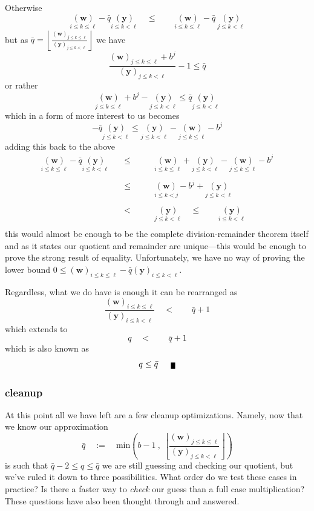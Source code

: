 \documentclass[twoside]{article}
\renewcommand{\leq}{\ensuremath{\quad\le\qquad}}
\newcommand{\bradix}[2][u]{\ensuremath{\underset{#2}{(\bm{#1})}}}
\newcommand{\numer}[3][w]{\ensuremath{(\bm{#1})_{#2\le k\le #3}}}
\newcommand{\denom}[3][y]{\ensuremath{(\bm{#1})_{#2\le k <  #3}}}
\newcommand{\qed}{\nobreak \ifvmode \relax \else
      \ifdim\lastskip<1.5em \hskip-\lastskip
      \hskip1.5em plus0em minus0.5em \fi \nobreak
      \vrule height0.5em width0.5em depth0.25em\fi}
\begin{document}
Otherwise
$$ \bradix[w]{i\le k\le\ell}-\bar{q}\bradix[y]{i\le k < \ell}
	\leq\bradix[w]{i\le k\le\ell}-\bar{q}\ \bradix[y]{j\le k < \ell} $$
but as $ \bar{q}=\left\lfloor\frac{\numer{j}{\ell}}{\denom{j}{\ell}}\right\rfloor $ we have
$$ \frac{\numer{j}{\ell}+b^j}{\denom{j}{\ell}}-1\le\bar{q} $$
or rather
$$ \bradix[w]{j\le k\le\ell}+b^j-\bradix[y]{j\le k < \ell}\le\bar{q}\bradix[y]{j\le k < \ell} $$
which in a form of more interest to us becomes
$$ -\bar{q}\bradix[y]{j\le k < \ell}\le\bradix[y]{j\le k < \ell}-\bradix[w]{j\le k\le\ell}-b^j $$
adding this back to the above
$$ \begin{array}{rcl}
\bradix[w]{i\le k\le\ell}-\bar{q}\bradix[y]{i\le k < \ell}
	& \leq & \bradix[w]{i\le k\le\ell}+\bradix[y]{j\le k < \ell}-\bradix[w]{j\le k\le\ell}-b^j \\
\\
	& \leq & \bradix[w]{i\le k < j}-b^j+\bradix[y]{j\le k < \ell} \\
\\
	& \quad <\qquad & \bradix[y]{j\le k < \ell}\leq\bradix[y]{i\le k < \ell} \\
\end{array} $$
this would almost be enough to be the complete division-remainder theorem itself and as it states our quotient and remainder
are unique---this would be enough to prove the strong result of equality. Unfortunately, we have no way of proving the lower
bound $ 0\le\numer{i}{\ell}-\bar{q}\denom{i}{\ell} $.

Regardless, what we do have is enough it can be rearranged as
$$ \frac{\numer{i}{\ell}}{\denom{i}{\ell}}
	\quad <\qquad\bar{q}+1 $$
which extends to
$$ q\quad <\qquad\bar{q}+1 $$
which is also known as
$$ q\le\bar{q}\qed $$

\subsubsection*{cleanup}

At this point all we have left are a few cleanup optimizations. Namely, now that we know our approximation
$$ \bar{q}\quad:=\quad\mbox{min}\left(b-1\ ,\ \left\lfloor\frac{\numer{j}{\ell}}{\denom{j}{\ell}}\right\rfloor\right) $$
is such that
$ \bar{q}-2\le q\le\bar{q} $
we are still guessing and checking our quotient, but we've ruled it down to three possibilities. What order do we test these
cases in practice? Is there a faster way to \emph{check} our guess than a full case multiplication? These questions have also
been thought through and answered.
\end{document}
